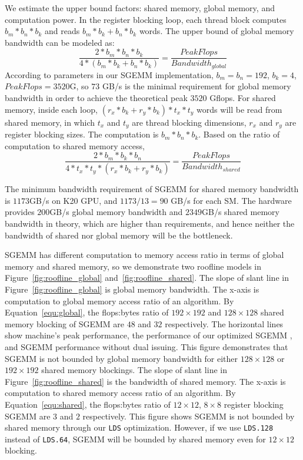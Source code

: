 We estimate the upper bound factors: 
shared memory, global memory, and computation power. In the register blocking loop, each thread block computes $b_m*b_n*b_k$ and reads $b_m*b_k+b_n*b_k$ words. The upper bound of global memory bandwidth can be modeled as:
\begin{equation}
    \frac{2*b_m*b_n*b_k}{4*(b_m*b_k + b_n*b_k)} = \frac{PeakFlops}{Bandwidth_{global}}
    \label{equ:global}
\end{equation}
According to parameters in our SGEMM implementation, $b_m=b_n=192$, $b_k=4$, $PeakFlops=3520$G, so $73$ GB/s is the minimal
requirement for global memory bandwidth in order to achieve the theoretical peak $3520$ Gflops.
For shared memory, inside each loop, $(r_x*b_k + r_y * b_k)*t_x*t_y$ words will be read from shared memory, in which $t_x$ and
$t_y$ are thread blocking dimensions, $r_x$ and $r_y$ are register blocking sizes. The computation is $b_m*b_n*b_k$. Based on the ratio of computation to shared memory access,
\begin{equation}
    \frac{2*b_m*b_k*b_n}{4*t_x*t_y*(r_x*b_k + r_y *b_k)}  = \frac{PeakFlops}{Bandwidth_{shared}}
    \label{equ:shared}
\end{equation}


The minimum bandwidth requirement of SGEMM for shared memory bandwidth is
$1173$GB/s on K20 GPU, and $1173/13=90$ GB/s for each SM. The hardware provides
$200$GB/s global memory bandwidth and $2349$GB/s shared memory bandwidth in
theory, which are higher than requirements, and hence neither the bandwidth of
shared nor global memory will be the bottleneck.

SGEMM has different computation to memory access ratio in terms of global memory and shared memory, so we demonstrate
two roofline models in Figure~\ref{fig:roofline_global} and~\ref{fig:roofline_shared}. 
The slope of slant line in Figure~\ref{fig:roofline_global} is global memory bandwidth. The x-axis is computation to global
memory access ratio of an algorithm. 
By Equation~\ref{equ:global}, the flops:bytes ratio of $192\times192$ and $128\times128$ shared 
memory blocking of SGEMM are $48$ and $32$ respectively. The horizontal lines
show machine's peak performance, the performance of our optimized SGEMM
, and SGEMM performance without dual issuing.
This figure demonstrates that SGEMM is not bounded by global memory bandwidth
for either $128\times128$ or $192\times 192$ shared memory blockings.
The slope of slant line in Figure~\ref{fig:roofline_shared} is the bandwidth of shared memory. The x-axis is computation to
shared memory access ratio of an algorithm. 
By Equation~\ref{equ:shared}, the flops:bytes ratio of $12\times12$, $8\times8$ register blocking SGEMM are $3$ and $2$ respectively. 
This figure shows SGEMM is not bounded by shared memory through our {\tt LDS} optimization. 
However, if we use {\tt LDS.128} instead of {\tt LDS.64}, SGEMM will be bounded by shared memory even for $12\times 12$ blocking.

